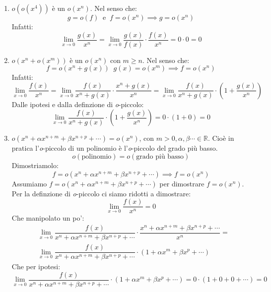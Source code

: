 \begin{enumerate}
	\item $o(o(x^4))$ è un $o(x^n)$. Nel senso che:
		\begin{equation*}
			g = o(f) \;\; \text{e} \;\; f = o(x^n) \implies g = o(x^n)
		\end{equation*}
		Infatti:
		\begin{equation*}
			\lim_{x \to 0} \dfrac{g(x)}{x^n} = \lim_{x \to 0} \dfrac{g(x)}{f(x)} \cdot \dfrac{f(x)}{x^n} = 0 \cdot 0 = 0
		\end{equation*}

	\item $o(x^n + o(x^m))$ è un $o(x^n)$ con $m \geq n$. Nel senso che:
		\begin{equation*}
			f = o(x^n + g(x)) \;\; g(x) = o(x^m) \implies f = o(x^n)
		\end{equation*}
		Infatti:
		\begin{equation*}
			\lim_{x \to 0} \dfrac{f(x)}{x^n} = \lim_{x \to 0} \dfrac{f(x)}{x^n + g(x)} \cdot \dfrac{x^n + g(x)}{x^n} = \lim_{x \to 0} \dfrac{f(x)}{x^n + g(x)} \cdot \left(1 + \dfrac{g(x)}{x^n}\right)
		\end{equation*}
		Dalle ipotesi e dalla definzione di \textit{o}-piccolo:
		\begin{equation*}
			\lim_{x \to 0} \dfrac{f(x)}{x^n + g(x)} \cdot \left(1 + \dfrac{g(x)}{x^n}\right) = 0 \cdot (1 + 0) = 0
		\end{equation*}

	\item $o(x^n + \alpha x^{n+m} + \beta x^{n + p} + \cdots) = o(x^n)$, con $m > 0, \alpha, \beta \cdots \in \mathbb{R}$. Cioè in pratica l'\textit{o}-piccolo di un polinomio è l'\textit{o}-piccolo del grado più basso.
		\begin{equation*}
			o(\text{polinomio}) = o(\text{grado più basso})
		\end{equation*}
		Dimostriamolo:
		\begin{equation*}
			f = o(x^n + \alpha x^{n+m} + \beta x^{n + p} + \cdots) \implies f = o(x^n)
		\end{equation*}
		Assumiamo $f = o(x^n + \alpha x^{n+m} + \beta x^{n + p} + \cdots)$ per dimostrare $f = o(x^n)$. Per la definzione di \textit{o}-piccolo ci siamo ridotti a dimostrare:
		\begin{equation*}
			\lim_{x \to 0} \dfrac{f(x)}{x^n} = 0
		\end{equation*}
		Che manipolato un po':
		\begin{align*}
			&\lim_{x \to 0} \dfrac{f(x)}{x^n + \alpha x^{n+m} + \beta x^{n + p} + \cdots} \cdot \dfrac{x^n + \alpha x^{n+m} + \beta x^{n + p} + \cdots}{x^n} =\\[10pt]
			&\lim_{x \to 0} \dfrac{f(x)}{x^n + \alpha x^{n+m} + \beta x^{n + p} + \cdots} \cdot (1 + \alpha x^{m} + \beta x^{p} + \cdots)
		\end{align*}
		Che per ipotesi:
		\begin{equation*}
			\lim_{x \to 0} \dfrac{f(x)}{x^n + \alpha x^{n+m} + \beta x^{n + p} + \cdots} \cdot (1 + \alpha x^{m} + \beta x^{p} + \cdots) = 0 \cdot (1 + 0 + 0 + \cdots) = 0
		\end{equation*}


\end{enumerate}
